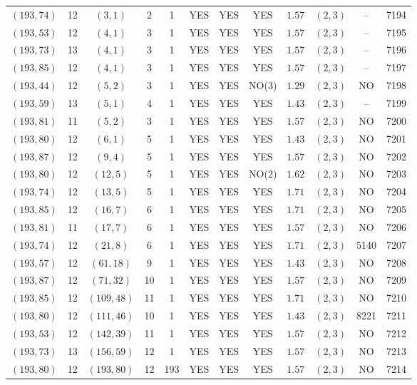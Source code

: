 \begin{longtable}{|c|c|c|c|c|c|c|c|c|c|c|c|}
$(193,74)$ & 12 & $(3,1)$ & 2 & 1 & YES & YES & YES & $1.57$ & $(2,3)$ & -- & 7194\\
$(193,53)$ & 12 & $(4,1)$ & 3 & 1 & YES & YES & YES & $1.57$ & $(2,3)$ & -- & 7195\\
$(193,73)$ & 13 & $(4,1)$ & 3 & 1 & YES & YES & YES & $1.57$ & $(2,3)$ & -- & 7196\\
$(193,85)$ & 12 & $(4,1)$ & 3 & 1 & YES & YES & YES & $1.57$ & $(2,3)$ & -- & 7197\\
$(193,44)$ & 12 & $(5,2)$ & 3 & 1 & YES & YES & NO(3) & $1.29$ & $(2,3)$ & NO & 7198\\
$(193,59)$ & 13 & $(5,1)$ & 4 & 1 & YES & YES & YES & $1.43$ & $(2,3)$ & -- & 7199\\
$(193,81)$ & 11 & $(5,2)$ & 3 & 1 & YES & YES & YES & $1.57$ & $(2,3)$ & NO & 7200\\
$(193,80)$ & 12 & $(6,1)$ & 5 & 1 & YES & YES & YES & $1.43$ & $(2,3)$ & NO & 7201\\
$(193,87)$ & 12 & $(9,4)$ & 5 & 1 & YES & YES & YES & $1.57$ & $(2,3)$ & NO & 7202\\
$(193,80)$ & 12 & $(12,5)$ & 5 & 1 & YES & YES & NO(2) & $1.62$ & $(2,3)$ & NO & 7203\\
$(193,74)$ & 12 & $(13,5)$ & 5 & 1 & YES & YES & YES & $1.71$ & $(2,3)$ & NO & 7204\\
$(193,85)$ & 12 & $(16,7)$ & 6 & 1 & YES & YES & YES & $1.71$ & $(2,3)$ & NO & 7205\\
$(193,81)$ & 11 & $(17,7)$ & 6 & 1 & YES & YES & YES & $1.57$ & $(2,3)$ & NO & 7206\\
$(193,74)$ & 12 & $(21,8)$ & 6 & 1 & YES & YES & YES & $1.71$ & $(2,3)$ & 5140 & 7207\\
$(193,57)$ & 12 & $(61,18)$ & 9 & 1 & YES & YES & YES & $1.43$ & $(2,3)$ & NO & 7208\\
$(193,87)$ & 12 & $(71,32)$ & 10 & 1 & YES & YES & YES & $1.57$ & $(2,3)$ & NO & 7209\\
$(193,85)$ & 12 & $(109,48)$ & 11 & 1 & YES & YES & YES & $1.71$ & $(2,3)$ & NO & 7210\\
$(193,80)$ & 12 & $(111,46)$ & 10 & 1 & YES & YES & YES & $1.43$ & $(2,3)$ & 8221 & 7211\\
$(193,53)$ & 12 & $(142,39)$ & 11 & 1 & YES & YES & YES & $1.57$ & $(2,3)$ & NO & 7212\\
$(193,73)$ & 13 & $(156,59)$ & 12 & 1 & YES & YES & YES & $1.57$ & $(2,3)$ & NO & 7213\\
$(193,80)$ & 12 & $(193,80)$ & 12 & 193 & YES & YES & YES & $1.57$ & $(2,3)$ & NO & 7214\\

\end{longtable}
